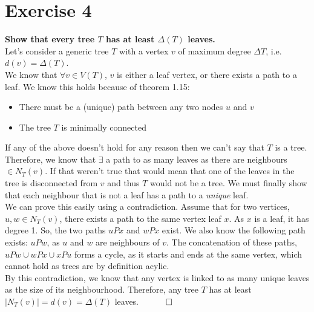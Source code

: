\section*{Exercise 4}
\boldmath
\textbf{Show that every tree $T$ has at least $\Delta(T)$ leaves.}\\
\unboldmath
\linebreak
Let's consider a generic tree $T$ with a vertex $v$ of maximum degree $\Delta T$, i.e. $d(v) = \Delta(T)$. \\
\linebreak 
We know that $\forall v \in V(T)$, $v$ is either a leaf vertex, or there exists a path to a leaf. We know this holds because of theorem 1.15:
\begin{itemize}
       \item There must be a (unique) path between any two nodes $u$ and $v$
       \item The tree $T$ is minimally connected
\end{itemize}
If any of the above doesn't hold for any reason then we can't say that $T$ is a tree. 
\\
\linebreak 
Therefore, we know that $\exists$ a path to as many leaves as there are neighbours $\in N_T(v)$. If that weren't true that would mean that one of the leaves in the tree is disconnected from $v$ and thus $T$ would not be a tree. We must finally show that each neighbour that is not a leaf has a path to a \textit{unique} leaf. \\
\linebreak 
We can prove this easily using a contradiction. Assume that for two vertices, $u, w \in N_T(v)$, there exists a path to the same vertex leaf $x$. As $x$ is a leaf, it has degree 1.
\linebreak 
So, the two paths $uPx$ and $wPx$ exist. We also know the following path exists: $uPw$, as $u$ and $w$ are neighbours of $v$. The concatenation of these paths, $uPw \cup wPx \cup xPu$ forms a cycle, as it starts and ends at the same vertex, which cannot hold as trees are by definition acylic.  \\
\linebreak 
By this contradiction, we know that any vertex is linked to as many unique leaves as the size of its neighbourhood. Therefore, any tree $T$ has at least $|N_T(v)| = d(v) = \Delta(T)$ leaves. $\hspace{10mm} \square$ 
